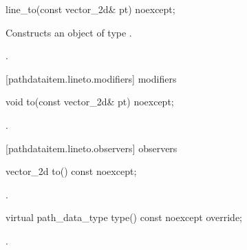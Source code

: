 \begin{itemdecl}
    line_to(const vector_2d& pt) noexcept;
\end{itemdecl}
\begin{itemdescr}
	\pnum
	\effects
	Constructs an object of type .
	
	\pnum
	\postconditions
	.
\end{itemdescr}

 [pathdataitem.lineto.modifiers]{ modifiers}

\begin{itemdecl}
    void to(const vector_2d& pt) noexcept;
\end{itemdecl}
\begin{itemdescr}
	\pnum
	\postconditions
	.
	
\end{itemdescr}

 [pathdataitem.lineto.observers]{ observers}

\begin{itemdecl}
    vector_2d to() const noexcept;
\end{itemdecl}
\begin{itemdescr}
	\pnum
	\returns
	.

\end{itemdescr}

\begin{itemdecl}
    virtual path_data_type type() const noexcept override;
\end{itemdecl}
\begin{itemdescr}
	\pnum
	\returns
	.

\end{itemdescr}
